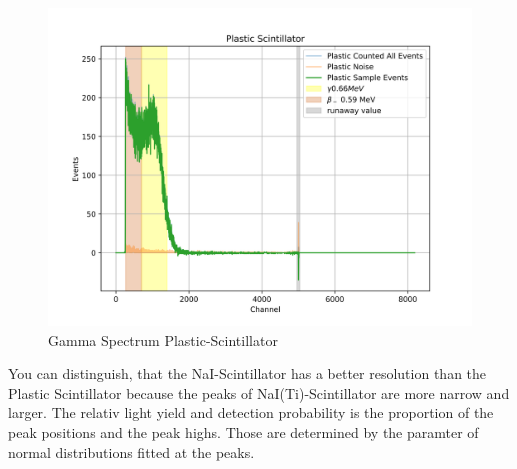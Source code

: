 \documentclass[12pt,twoside,a4paper]{scrartcl}
\begin{document}
            \begin{figure}[H]
                \includegraphics{Plots/Scinti/SpektrenPlastic.png}
                \caption{Gamma Spectrum Plastic-Scintillator}
            \end{figure}
            You can distinguish, that the NaI-Scintillator has a better resolution
            than the Plastic Scintillator because the peaks of NaI(Ti)-Scintillator
            are more narrow and larger. The relativ light yield and detection probability is the proportion
            of the peak positions and the peak highs. Those are determined by the
            paramter of normal distributions fitted at the peaks.
\end{document}

